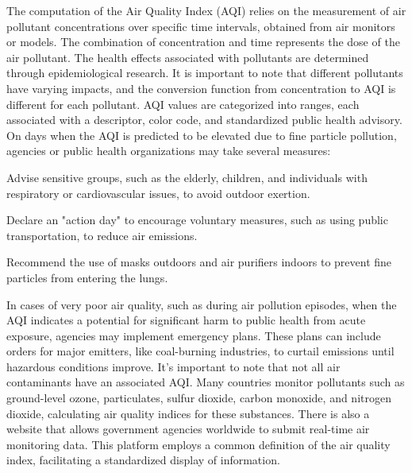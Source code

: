 The computation of the Air Quality Index (AQI) relies on the measurement of air pollutant concentrations over specific time intervals, obtained from air monitors or models. The combination of concentration and time represents the dose of the air pollutant. The health effects associated with pollutants are determined through epidemiological research. It is important to note that different pollutants have varying impacts, and the conversion function from concentration to AQI is different for each pollutant. AQI values are categorized into ranges, each associated with a descriptor, color code, and standardized public health advisory.
On days when the AQI is predicted to be elevated due to fine particle pollution, agencies or public health organizations may take several measures:
\begin{compactenum}
    \item Advise sensitive groups, such as the elderly, children, and individuals with respiratory or cardiovascular issues, to avoid outdoor exertion.
    \item Declare an "action day" to encourage voluntary measures, such as using public transportation, to reduce air emissions.
    \item Recommend the use of masks outdoors and air purifiers indoors to prevent fine particles from entering the lungs.
\end{compactenum}
In cases of very poor air quality, such as during air pollution episodes, when the AQI indicates a potential for significant harm to public health from acute exposure, agencies may implement emergency plans. These plans can include orders for major emitters, like coal-burning industries, to curtail emissions until hazardous conditions improve.
It's important to note that not all air contaminants have an associated AQI. Many countries monitor pollutants such as ground-level ozone, particulates, sulfur dioxide, carbon monoxide, and nitrogen dioxide, calculating air quality indices for these substances.
There is also a website \cite{Airqualityindexwebsite} that allows government agencies worldwide to submit real-time air monitoring data. This platform employs a common definition of the air quality index, facilitating a standardized display of information.

